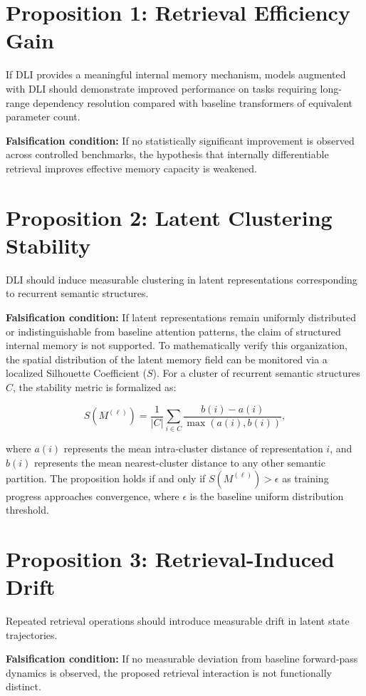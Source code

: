 \section*{Proposition 1: Retrieval Efficiency Gain}
If DLI provides a meaningful internal memory mechanism, models augmented with DLI should demonstrate improved performance on tasks requiring long-range dependency resolution compared with baseline transformers of equivalent parameter count.

\textbf{Falsification condition:} If no statistically significant improvement is observed across controlled benchmarks, the hypothesis that internally differentiable retrieval improves effective memory capacity is weakened.

\section*{Proposition 2: Latent Clustering Stability}
DLI should induce measurable clustering in latent representations corresponding to recurrent semantic structures.

\textbf{Falsification condition:} If latent representations remain uniformly distributed or indistinguishable from baseline attention patterns, the claim of structured internal memory is not supported. To mathematically verify this organization, the spatial distribution of the latent memory field can be monitored via a localized Silhouette Coefficient ($S$). For a cluster of recurrent semantic structures $C$, the stability metric is formalized as:

\begin{equation}
S(M^{(\ell)}) = \frac{1}{|C|} \sum_{i \in C} \frac{b(i) - a(i)}{\max(a(i), b(i))},
\end{equation}

where $a(i)$ represents the mean intra-cluster distance of representation $i$, and $b(i)$ represents the mean nearest-cluster distance to any other semantic partition. The proposition holds if and only if $S(M^{(\ell)}) > \epsilon$ as training progress approaches convergence, where $\epsilon$ is the baseline uniform distribution threshold.

\section*{Proposition 3: Retrieval-Induced Drift}
Repeated retrieval operations should introduce measurable drift in latent state trajectories.

\textbf{Falsification condition:} If no measurable deviation from baseline forward-pass dynamics is observed, the proposed retrieval interaction is not functionally distinct.

